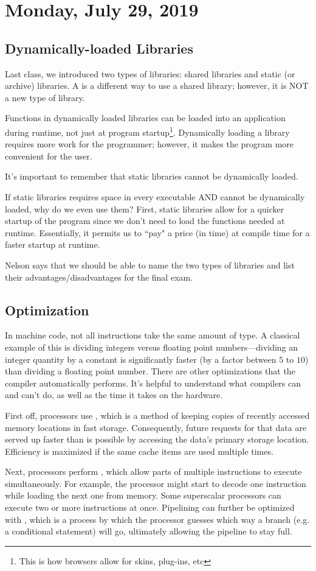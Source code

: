 \section{Monday, July 29, 2019}
\subsection{Dynamically-loaded Libraries}
Last class, we introduced two types of libraries: shared libraries and static (or archive) libraries. A  is a different way to use a shared library; however, it is NOT a new type of library.

Functions in dynamically loaded libraries can be loaded into an application during runtime, not just at program startup\footnote{This is how browsers allow for skins, plug-ins, etc}. Dynamically loading a library requires more work for the programmer; however, it makes the program more convenient for the user. 

It's important to remember that static libraries cannot be dynamically loaded. 

If static libraries requires space in every executable AND cannot be dynamically loaded, why do we even use them? First, static libraries allow for a quicker startup of the program since we don't need to load the functions needed at runtime. Essentially, it permits us to ``pay" a price (in time) at compile time for a faster startup at runtime. 

Nelson says that we should be able to name the two types of libraries and list their advantages/disadvantages for the final exam.

\subsection{Optimization} 
In machine code, not all instructions take the same amount of type. A classical example of this is dividing integers versus floating point numbers---dividing an integer quantity by a constant is significantly faster (by a factor between $5$ to $10$) than dividing a floating point number. There are other optimizations that the compiler automatically performs. It's helpful to understand what compilers can and can't do, as well as the time it takes on the hardware.

First off, processors use , which is a method of keeping copies of recently accessed memory locations in fast storage. Consequently, future requests for that data are served up faster than is possible by accessing the data's primary storage location. Efficiency is maximized if the same cache items are used multiple times.

Next, processors perform , which allow parts of multiple instructions to execute simultaneously. For example, the processor might start to decode one instruction while loading the next one from memory. Some superscalar processors can execute two or more instructions at once. Pipelining can further be optimized with , which is a process by which the processor guesses which way a branch (e.g. a conditional statement) will go, ultimately allowing the pipeline to stay full. 

